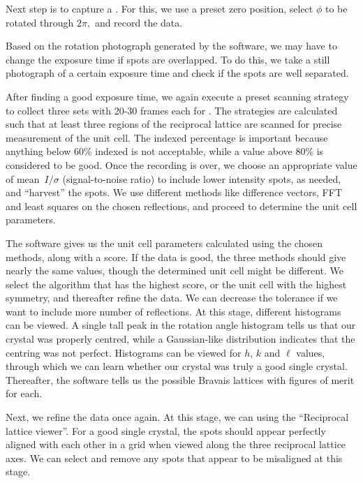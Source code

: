 Next step is to capture a . For this, we use a preset zero position, select $\phi$ to be rotated through $2\pi,$ and record the data.

Based on the rotation photograph generated by the software, we may have to change the exposure time if spots are overlapped. To do this, we take a still photograph of a certain exposure time and check if the spots are well separated.

After finding a good exposure time, we again execute a preset scanning strategy to collect three sets with 20-30 frames each for . The strategies are calculated such that at least three regions of the reciprocal lattice are scanned for precise measurement of the unit cell. The indexed percentage is important because anything below 60\% indexed is not acceptable, while a value above 80\% is considered to be good. Once the recording is over, we choose an appropriate value of mean~$I/\sigma$ (signal-to-noise ratio) to include lower intensity spots, as needed, and ``harvest'' the spots. We use different methods like difference vectors, FFT and least squares on the chosen reflections, and proceed to determine the unit cell parameters.

The software gives us the unit cell parameters calculated using the chosen methods, along with a score. If the data is good, the three methods should give nearly the same values, though the determined unit cell might be different. We select the algorithm that has the highest score, or the unit cell with the highest symmetry, and thereafter refine the data. We can decrease the tolerance if we want to include more number of reflections. At this stage, different histograms can be viewed. A single tall peak in the rotation angle histogram tells us that our crystal was properly centred, while a Gaussian-like distribution indicates that the centring was not perfect. Histograms can be viewed for $h$, $k$ and $\ell$ values, through which we can learn whether our crystal was truly a good single crystal. Thereafter, the software tells us the possible Bravais lattices with figures of merit for each.

Next, we refine the data once again. At this stage, we can  using the ``Reciprocal lattice viewer''. For a good single crystal, the spots should appear perfectly aligned with each other in a grid when viewed along the three reciprocal lattice axes. We can select and remove any spots that appear to be misaligned at this stage.


